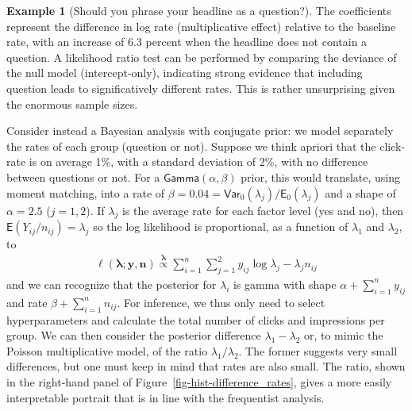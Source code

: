 \documentclass[
  11pt,
  letterpaper,
]{scrbook}
\theoremstyle{definition}
\theoremstyle{plain}
\theoremstyle{plain}
\theoremstyle{definition}
\newtheorem{example}{Example}[chapter]
\theoremstyle{definition}
\theoremstyle{remark}
\begin{document}
\begin{example}[Should you phrase your headline as a
question?]
The coefficients represent the difference in log rate (multiplicative
effect) relative to the baseline rate, with an increase of 6.3 percent
when the headline does not contain a question. A likelihood ratio test
can be performed by comparing the deviance of the null model
(intercept-only), indicating strong evidence that including question
leads to significatively different rates. This is rather unsurprising
given the enormous sample sizes.

Consider instead a Bayesian analysis with conjugate prior: we model
separately the rates of each group (question or not). Suppose we think
apriori that the click-rate is on average 1\%, with a standard deviation
of 2\%, with no difference between questions or not. For a
\(\mathsf{Gamma}(\alpha, \beta)\) prior, this would translate, using
moment matching, into a rate of
\(\beta = 0.04 = \mathsf{Var}_0(\lambda_j)/\mathsf{E}_0(\lambda_j)\) and
a shape of \(\alpha = 2.5\) (\(j=1, 2\)). If \(\lambda_{j}\) is the
average rate for each factor level (yes and no), then
\(\mathsf{E}(Y_{ij}/n_{ij}) = \lambda_j\) so the log likelihood is
proportional, as a function of \(\lambda_1\) and \(\lambda_2\), to
\begin{align*}
\ell(\boldsymbol{\lambda}; \boldsymbol{y}, \boldsymbol{n}) \stackrel{\boldsymbol{\lambda}}{\propto} \sum_{i=1}^n \sum_{j=1}^2 y_{ij}\log \lambda_j - \lambda_jn_{ij}
\end{align*} and we can recognize that the posterior for \(\lambda_i\)
is gamma with shape \(\alpha + \sum_{i=1}^n y_{ij}\) and rate
\(\beta + \sum_{i=1}^n n_{ij}.\) For inference, we thus only need to
select hyperparameters and calculate the total number of clicks and
impressions per group. We can then consider the posterior difference
\(\lambda_1 - \lambda_2\) or, to mimic the Poisson multiplicative model,
of the ratio \(\lambda_1/\lambda_2\). The former suggests very small
differences, but one must keep in mind that rates are also small. The
ratio, shown in the right-hand panel of
Figure~\ref{fig-hist-difference_rates}, gives a more easily
interpretable portrait that is in line with the frequentist analysis.

\begin{figure}[ht!]

\centering{

}
\end{figure}
\end{example}
\end{document}
